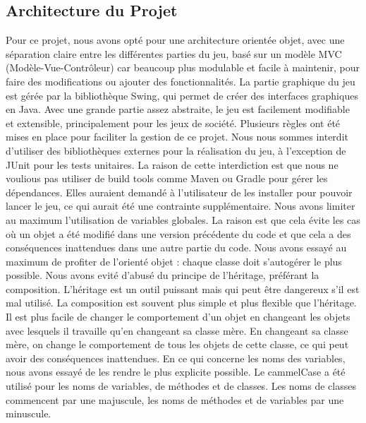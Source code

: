 \documentclass{article}
\begin{document}
    \subsection{Architecture du Projet}\label{subsec:architecture-du-projet}
    Pour ce projet, nous avons opté pour une architecture orientée objet, avec une séparation claire entre les différentes parties du jeu, basé sur un modèle MVC (Modèle-Vue-Contrôleur) car beaucoup plus modulable et facile à maintenir, pour faire des modifications ou ajouter des fonctionnalités.
    La partie graphique du jeu est gérée par la bibliothèque Swing, qui permet de créer des interfaces graphiques en Java.
    Avec une grande partie assez abstraite, le jeu est facilement modifiable et extensible, principalement pour les jeux de société.
    \newline
    Plusieurs règles ont été mises en place pour faciliter la gestion de ce projet.
    Nous nous sommes interdit d'utiliser des bibliothèques externes pour la réalisation du jeu, à l'exception de JUnit pour les tests unitaires.
    La raison de cette interdiction est que nous ne voulious pas utiliser de build tools comme Maven ou Gradle pour gérer les dépendances.
    Elles auraient demandé à l'utilisateur de les installer pour pouvoir lancer le jeu, ce qui aurait été une contrainte supplémentaire.
    Nous avons limiter au maximum l'utilisation de variables globales.
    La raison est que cela évite les cas où un objet a été modifié dans une version précédente du code et que cela a des conséquences inattendues dans une autre partie du code.
    Nous avons essayé au maximum de profiter de l'orienté objet : chaque classe doit s'autogérer le plus possible.
    Nous avons evité d'abusé du principe de l'héritage, préférant la composition.
    L'héritage est un outil puissant mais qui peut être dangereux s'il est mal utilisé.
    La composition est souvent plus simple et plus flexible que l'héritage.
    Il est plus facile de changer le comportement d'un objet en changeant les objets avec lesquels il travaille qu'en changeant sa classe mère.
    En changeant sa classe mère, on change le comportement de tous les objets de cette classe, ce qui peut avoir des conséquences inattendues.
    \newline
    En ce qui concerne les noms des variables, nous avons essayé de les rendre le plus explicite possible.
    Le cammelCase a été utilisé pour les noms de variables, de méthodes et de classes. 
    Les noms de classes commencent par une majuscule, les noms de méthodes et de variables par une minuscule.
\end{document}
